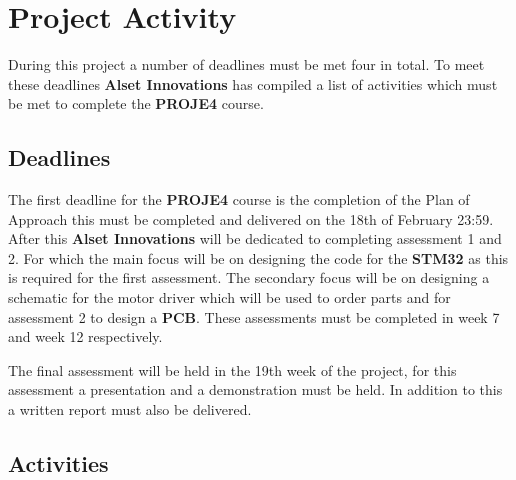 \section{Project Activity}
During this project a number of deadlines must be met four in total. To meet these deadlines \textbf{Alset Innovations} has compiled a list of activities which must be met to complete the \textbf{PROJE4} course.

\subsection{Deadlines}
The first deadline for the \textbf{PROJE4} course is the completion of the Plan of Approach this must be completed and delivered on the 18th of February 23:59. After this \textbf{Alset Innovations} will be dedicated to completing assessment 1 and 2. For which the main focus will be on designing the code for the \textbf{STM32} as this is required for the first assessment. The secondary focus will be on designing a schematic for the motor driver which will be used to order parts and for assessment 2 to design a \textbf{PCB}. These assessments must be completed in week 7 and week 12 respectively.

The final assessment will be held in the 19th week of the project, for this assessment a presentation and a demonstration must be held. In addition to this a written report must also be delivered.

\subsection{Activities}
